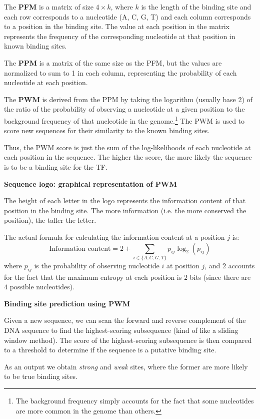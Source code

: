 \documentclass[a4paper]{article}
\begin{document}
The \textbf{PFM} is a matrix of size $4 \times k$, where $k$ is the length of the 
binding site and each row corresponds to a nucleotide (A, C, G, T) and each 
column corresponds to a position in the binding site. The value at each
position in the matrix represents the frequency of the corresponding nucleotide
at that position in known binding sites.

The \textbf{PPM} is a matrix of the same size as the PFM, but the values are
normalized to sum to 1 in each column, representing the probability of each
nucleotide at each position.

The \textbf{PWM} is derived from the PPM by taking the logarithm (usually base 2)
of the ratio of the probability of observing a nucleotide at a given position
to the background frequency of that nucleotide in the genome.\footnote{The
background frequency simply accounts for the fact that some nucleotides are
more common in the genome than others.} The PWM is used to score new sequences
for their similarity to the known binding sites.

Thus, the PWM score is just the sum of the log-likelihoods of each nucleotide
at each position in the sequence. The higher the score, the more likely the
sequence is to be a binding site for the TF.

\textbf{Sequence logo: graphical representation of PWM}

The height of each letter in the logo represents the information content of
that position in the binding site. The more information (i.e. the 
more conserved the position), the taller the letter. 

The actual formula for calculating the information content at a position $j$ is:
\[
\text{Information content} = 2 + \sum_{i \in \{A, C, G, T\}} p_{ij} \log_2 
\left( p_{ij} \right)
\]
where $p_{ij}$ is the probability of observing nucleotide $i$ at position $j$,
and $2$ accounts for the fact that the maximum entropy at each position is
$2$ bits (since there are $4$ possible nucleotides).

\textbf{Binding site prediction using PWM}

Given a new sequence, we can scan the forward and reverse complement of the
DNA sequence to find the highest-scoring subsequence (kind of like a sliding
window method). The score of the highest-scoring subsequence is then compared
to a threshold to determine if the sequence is a putative binding site.

As an output we obtain \textit{strong} and \textit{weak} sites, where the former
are more likely to be true binding sites. 
\end{document}
